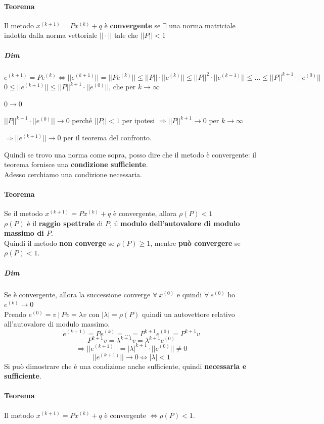 \documentclass[10pt]{book}
\begin{document}
\paragraph{Teorema} Il metodo $x^{(k+1)} = Px^{(k)} + q$ è \textbf{convergente} se $\exists$ una norma matriciale indotta dalla norma vettoriale $||\cdot||$ tale che $||P|| < 1$
\subparagraph{Dim} $e^{(k + 1)} = Pe^{(k)} \Leftrightarrow ||e^{(k + 1)}|| = ||Pe^{(k)}|| \leq ||P||\cdot||e^{(k)}|| \leq ||P||^2\cdot||e^{(k-1)}|| \leq \ldots \leq ||P||^{k+1}\cdot||e^{(0)}||$\\
$0 \leq ||e^{(k+1)}|| \leq ||P||^{k+1}\cdot||e^{(0)}||$, che per $k\to\infty$
\begin{list}{}{}
	\item $0\to 0$
	\item $||P||^{k+1}\cdot||e^{(0)}||\to 0$ perché $||P|| < 1$ per ipotesi $\Rightarrow||P||^{k+1}\to 0$ per $k\to\infty$
	\item $\Rightarrow||e^{(k+1)}||\to 0$ per il teorema del confronto.
\end{list}
Quindi se trovo una norma come sopra, posso dire che il metodo è convergente: il teorema fornisce una \textbf{condizione sufficiente}.\\
Adesso cerchiamo una condizione necessaria.
\paragraph{Teorema} Se il metodo $x^{(k+1)} = Px^{(k)} + q$ è convergente, allora $\rho(P) < 1$\\
$\rho(P)$ è il \textbf{raggio spettrale} di $P$, il \textbf{modulo dell'autovalore di modulo massimo di $P$}.\\
Quindi il metodo \textbf{non converge} se $\rho(P) \geq 1$, mentre \textbf{può convergere} se $\rho(P) < 1$.
\subparagraph{Dim} Se è convergente, allora la successione converge $\forall\: x^{(0)}$ e quindi $\forall\:e^{(0)}$ ho $e^{(k)}\to 0$\\
Prendo $e^{(0)} = v\:|\: Pv = \lambda v$ con $|\lambda| = \rho(P)$ quindi un autovettore relativo all'autovalore di modulo massimo.
$$e^{(k+1)} = Pe^{(k)} = \ldots = P^{k+1}e^{(0)} = P^{k+1}v$$
$$P^{k+1}v = \lambda^{k+1}v = \lambda^{k+1}e^{(0)}$$
$$\Rightarrow||e^{(k+1)}|| = |\lambda|^{k+1}\cdot||e^{(0)}|| \neq 0$$
$$||e^{(k+1)}||\to 0 \Leftrightarrow |\lambda| < 1$$
Si può dimostrare che è una condizione anche sufficiente, quindi \textbf{necessaria e sufficiente}.
\paragraph{Teorema} Il metodo $x^{(k+1)} = Px^{(k)} + q$ è convergente $\Leftrightarrow \rho(P) < 1$.
\pagebreak
\end{document}
